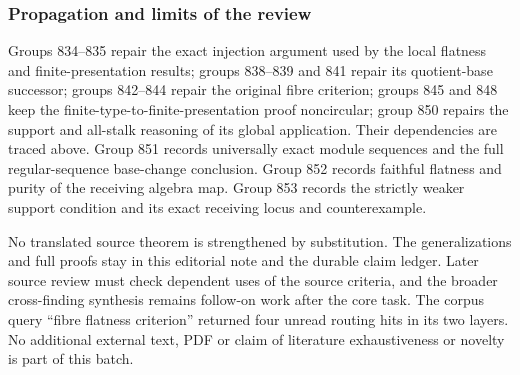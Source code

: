 \subsubsection{Propagation and limits of the review}\label{propagation-and-limits-of-the-review}

Groups 834--835 repair the exact injection argument used by the local flatness and finite-presentation results; groups 838--839 and 841 repair its quotient-base successor; groups 842--844 repair the original fibre criterion; groups 845 and 848 keep the finite-type-to-finite-presentation proof noncircular; group 850 repairs the support and all-stalk reasoning of its global application. Their dependencies are traced above. Group 851 records universally exact module sequences and the full regular-sequence base-change conclusion. Group 852 records faithful flatness and purity of the receiving algebra map. Group 853 records the strictly weaker support condition and its exact receiving locus and counterexample.

No translated source theorem is strengthened by substitution. The generalizations and full proofs stay in this editorial note and the durable claim ledger. Later source review must check dependent uses of the source criteria, and the broader cross-finding synthesis remains follow-on work after the core task. The corpus query ``fibre flatness criterion'' returned four unread routing hits in its two layers. No additional external text, PDF or claim of literature exhaustiveness or novelty is part of this batch.

